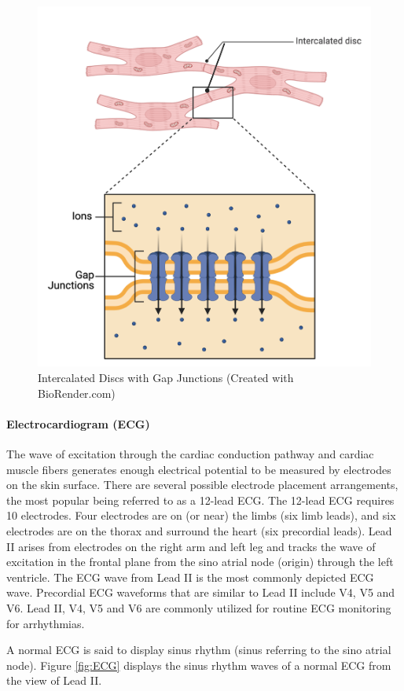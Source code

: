 \begin{figure}[!h]
    \centering
    \includegraphics[width=0.5\linewidth]{./figure/Cardiac_Gap_Junctions.png}
    \caption{Intercalated Discs with Gap Junctions \footnotesize{(Created with BioRender.com)}}
    \label{fig:Cardiac_Gap_Junctions}
\end{figure}

\paragraph{Electrocardiogram (ECG)}

The wave of excitation through the cardiac conduction pathway and cardiac muscle fibers generates enough electrical potential to be measured by electrodes on the skin surface. There are several possible electrode placement arrangements, the most popular being referred to as a 12-lead ECG. The 12-lead ECG requires 10 electrodes. Four electrodes are on (or near) the limbs (six limb leads), and six electrodes are on the thorax and surround the heart (six precordial leads). Lead II arises from electrodes on the right arm and left leg and tracks the wave of excitation in the frontal plane from the sino atrial node (origin) through the left ventricle. The ECG wave from Lead II is the most commonly depicted ECG wave. Precordial ECG waveforms that are similar to Lead II include V4, V5 and V6.  Lead II, V4, V5 and V6 are commonly utilized for routine ECG monitoring for arrhythmias. 

A normal ECG is said to display sinus rhythm (sinus referring to the sino atrial node). Figure \ref{fig:ECG} displays the sinus rhythm waves of a normal ECG from the view of Lead II.

